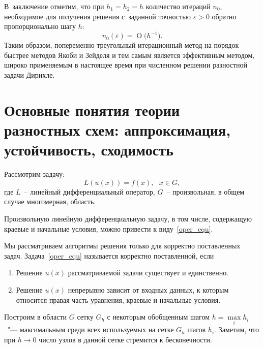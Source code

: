 \documentclass[11pt,a4paper,twoside]{report}
\numberwithin{equation}{section}
\theoremstyle{definition}
\theoremstyle{plain}
\newcommand{\bigO}[1]{\ensuremath{\operatorname{O}\bigl(#1\bigr)}}
\begin{document}
В~заключение отметим, что
при $h_1=h_2=h$ количество итераций $n_0$, необходимое
для получения решения с~заданной точностью $\varepsilon>0$ обратно пропорционально
шагу $h$:
%
$$
    n_0(\varepsilon)=\bigO{h^{-1}}.
$$
%
Таким образом, попеременно-треугольный итерационный метод на порядок быстрее
методов Якоби и Зейделя и тем самым является эффективным методом, широко
применяемым в настоящее время при численном решении разностной задачи Дирихле.
%
\section[Основные понятия теории разностных схем]
{Основные понятия теории разностных схем: аппроксимация, устойчивость, сходимость}
%
Рассмотрим задачу:
%
\begin{equation}
%
    \label{oper_equ}
    L(u(x)) = f(x),~~~x \in G,
%
\end{equation}
%
где $L$~-- линейный дифференциальный оператор, $G$~-- произвольная, в общем
случае многомерная, область.

Произвольную линейную дифференциальную задачу, в том числе, содержащую краевые
и начальные условия, можно привести к виду~\eqref{oper_equ}.

Мы рассматриваем алгоритмы решения только для корректно поставленных задач.
Задача~\eqref{oper_equ} называется корректно поставленной, если
%
\begin{enumerate}
%
    \item
    Решение $u(x)$ рассматриваемой задачи существует и единственно.
    \item
    Решение $u(x)$ непрерывно зависит от входных данных, к которым относится
    правая часть уравнения, краевые и начальные условия.
%
\end{enumerate}
%

Построим в области $G$ сетку $G_h$ с некоторым
обобщенным шагом $h = \max\limits_i{h_i}$~"--- максимальным среди всех
используемых на сетке $G_h$ шагов $h_i$. Заметим, что при $h \rightarrow 0$
число узлов в данной сетке стремится к бесконечности.
\end{document}
